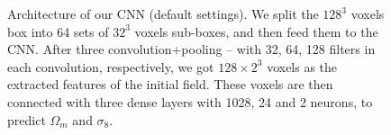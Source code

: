 \documentclass[twocolumn]{aastex61}
\begin{document}
\begin{figure}
   \caption{\label{fig_field}
   Architecture of our CNN (default settings).
   We split the $128^3$ voxels box into 64 sets of $32^3$ voxels sub-boxes, and then feed them to the CNN.
   After three convolution+pooling -- 
   with 32, 64, 128 filters in each convolution, respectively,
   we got $128\times 2^3$ voxels as the extracted features of the initial field.
   These voxels are then connected with three dense layers with 1028, 24 and 2 neurons,
   to predict $\Omega_m$ and $\sigma_8$.
   }
\end{figure}
\end{document}
